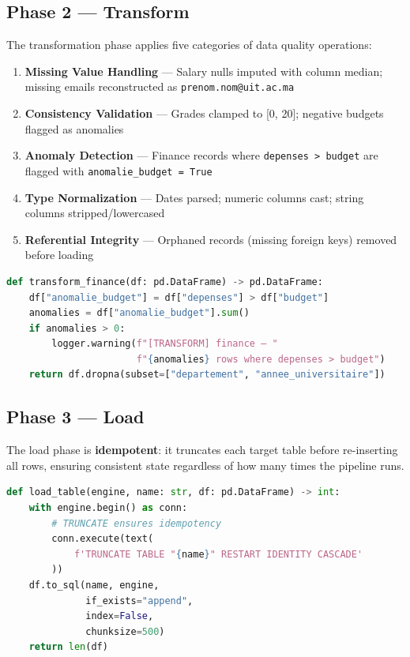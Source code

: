 \documentclass[12pt, a4paper]{report}
\begin{document}
\subsection{Phase 2 — Transform}

The transformation phase applies five categories of data quality operations:

\begin{enumerate}
  \item \textbf{Missing Value Handling} — Salary nulls imputed with column median; missing emails reconstructed as \texttt{prenom.nom@uit.ac.ma}
  \item \textbf{Consistency Validation} — Grades clamped to [0, 20]; negative budgets flagged as anomalies
  \item \textbf{Anomaly Detection} — Finance records where \texttt{depenses > budget} are flagged with \texttt{anomalie\_budget = True}
  \item \textbf{Type Normalization} — Dates parsed; numeric columns cast; string columns stripped/lowercased
  \item \textbf{Referential Integrity} — Orphaned records (missing foreign keys) removed before loading
\end{enumerate}

\begin{lstlisting}[language=Python, caption={Finance Anomaly Detection}]
def transform_finance(df: pd.DataFrame) -> pd.DataFrame:
    df["anomalie_budget"] = df["depenses"] > df["budget"]
    anomalies = df["anomalie_budget"].sum()
    if anomalies > 0:
        logger.warning(f"[TRANSFORM] finance — "
                       f"{anomalies} rows where depenses > budget")
    return df.dropna(subset=["departement", "annee_universitaire"])
\end{lstlisting}

\subsection{Phase 3 — Load}

The load phase is \textbf{idempotent}: it truncates each target table before re-inserting all rows, ensuring consistent state regardless of how many times the pipeline runs.

\begin{lstlisting}[language=Python, caption={Idempotent Load Pattern}]
def load_table(engine, name: str, df: pd.DataFrame) -> int:
    with engine.begin() as conn:
        # TRUNCATE ensures idempotency
        conn.execute(text(
            f'TRUNCATE TABLE "{name}" RESTART IDENTITY CASCADE'
        ))
    df.to_sql(name, engine,
              if_exists="append",
              index=False,
              chunksize=500)
    return len(df)
\end{lstlisting}
\end{document}
